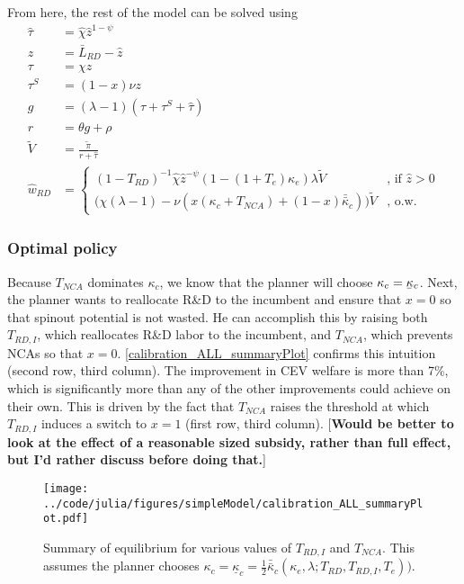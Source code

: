 \documentclass[11pt,english]{article}
\newcommand\munderbar[1]{%
	\underaccent{\bar}{#1}}
\begin{document}
From here, the rest of the model can be solved using
\begin{align}
\hat{\tau} &= \hat{\chi} \hat{z}^{1-\psi} \\
z &= \bar{L}_{RD} - \hat{z} \label{eq:labor_resource_constraint_all}\\ 
\tau &= \chi z \\
\tau^S &= (1-x) \nu z \\
g &= (\lambda - 1) (\tau + \tau^S + \hat{\tau}) \\
r &= \theta g + \rho \\
\tilde{V} &= \frac{\tilde{\pi}}{r + \hat{\tau}} \\ 
\hat{w}_{RD} &= \begin{cases}
(1-T_{RD})^{-1}\hat{\chi} \hat{z}^{-\psi} (1-(1+T_e)\kappa_e) \lambda \tilde{V} &\textrm{, if } \hat{z} > 0\\
\Big( \chi(\lambda -1) - \nu (x(\kappa_c + T_{NCA}) + (1-x)\bar{\bar{\kappa}}_c)\Big) \tilde{V} &\textrm{, o.w.}
\end{cases} \label{eq:wage_rd_labor_all}
\end{align}

\subsubsection{Optimal policy}

Because $T_{NCA}$ dominates $\kappa_c$, we know that the planner will choose $\kappa_c = \munderbar{\kappa}_c$. Next, the planner wants to reallocate R\&D to the incumbent and ensure that $x = 0$ so that spinout potential is not wasted. He can accomplish this by raising both $T_{RD,I}$, which reallocates R\&D labor to the incumbent, and $T_{NCA}$, which prevents NCAs so that $x = 0$. \autoref{calibration_ALL_summaryPlot} confirms this intuition (second row, third column). The improvement in CEV welfare is more than 7\%, which is significantly more than any of the other improvements could achieve on their own. This is driven by the fact that $T_{NCA}$ raises the threshold at which $T_{RD,I}$ induces a switch to $x = 1$ (first row, third column). [\textbf{Would be better to look at the effect of a reasonable sized subsidy, rather than full effect, but I'd rather discuss before doing that.}] 

\begin{figure}[]
	\texttt{[image: ../code/julia/figures/simpleModel/calibration\_ALL\_summaryPlot.pdf]}
	\caption{Summary of equilibrium for various values of $T_{RD,I}$ and $T_{NCA}$. This assumes the planner chooses $\kappa_c = \underline{\kappa}_c = \frac{1}{2} \bar{\bar{\kappa}}_c(\kappa_e,\lambda;T_{RD},T_{RD,I},T_e))$.}
	\label{calibration_ALL_summaryPlot}
\end{figure}
\end{document}
